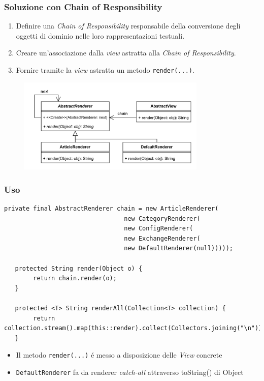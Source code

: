 \begin{frame}
    \frametitle{Soluzione con Chain of Responsibility}
    \begin{enumerate}
        \item Definire una \emph{Chain of Responsibility} responsabile della conversione degli oggetti
        di dominio nelle loro rappresentazioni testuali.
        \item Creare un'associazione dalla \emph{view} astratta alla \emph{Chain of Responsibility}.
        \item Fornire tramite la \emph{view} astratta un metodo \texttt{render(...)}.
    \end{enumerate}

    \begin{figure}
        \includegraphics[width=0.8\textwidth]{img/chain.png}
    \end{figure}
\end{frame}

\begin{frame}[fragile]
  \frametitle{Uso}
  \begin{lstlisting}[autogobble, title={\texttt{AbstractView.java}}]
   private final AbstractRenderer chain = new ArticleRenderer(
                                 new CategoryRenderer(
                                 new ConfigRenderer(
                                 new ExchangeRenderer(
                                 new DefaultRenderer(null)))));

   protected String render(Object o) {
        return chain.render(o);
   }

   protected <T> String renderAll(Collection<T> collection) {
        return collection.stream().map(this::render).collect(Collectors.joining("\n"));
   }
  \end{lstlisting}
    \begin{itemize}
        \item Il metodo \texttt{render(...)} é messo a disposizione delle \emph{View} concrete
        \item \texttt{DefaultRenderer} fa da renderer \emph{catch-all} attraverso toString()  di Object
    \end{itemize}
\end{frame}

